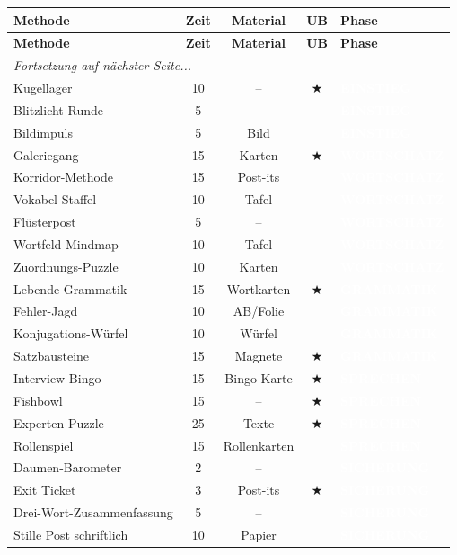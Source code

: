 \documentclass[11pt, a4paper]{article}
\newcommand{\tagEinstieg}{\colorbox{einstieg}{\textcolor{white}{\footnotesize\textbf{EINSTIEG}}}}
\newcommand{\tagWortschatz}{\colorbox{wortschatz}{\textcolor{white}{\footnotesize\textbf{WORTSCHATZ}}}}
\newcommand{\tagGrammatik}{\colorbox{grammatik}{\textcolor{white}{\footnotesize\textbf{GRAMMATIK}}}}
\newcommand{\tagSprechen}{\colorbox{sprechen}{\textcolor{white}{\footnotesize\textbf{SPRECHEN}}}}
\newcommand{\tagSicherung}{\colorbox{sicherung}{\textcolor{white}{\footnotesize\textbf{SICHERUNG}}}}
\begin{document}
\renewcommand{\arraystretch}{1.3}
\begin{longtable}{|p{3.5cm}|c|c|c|p{4cm}|}
\hline
\textbf{Methode} & \textbf{Zeit} & \textbf{Material} & \textbf{UB} & \textbf{Phase} \\
\hline
\endfirsthead
\hline
\textbf{Methode} & \textbf{Zeit} & \textbf{Material} & \textbf{UB} & \textbf{Phase} \\
\hline
\endhead

\multicolumn{5}{l}{\textit{Fortsetzung auf nächster Seite...}} \\
\endfoot

\hline
\endlastfoot

Kugellager & 10 & -- & $\bigstar$ & \tagEinstieg \\
\hline
Blitzlicht-Runde & 5 & -- & & \tagEinstieg \\
\hline
Bildimpuls & 5 & Bild & & \tagEinstieg \\
\hline

Galeriegang & 15 & Karten & $\bigstar$ & \tagWortschatz \\
\hline
Korridor-Methode & 15 & Post-its & & \tagWortschatz \\
\hline
Vokabel-Staffel & 10 & Tafel & & \tagWortschatz \\
\hline
Flüsterpost & 5 & -- & & \tagWortschatz \\
\hline
Wortfeld-Mindmap & 10 & Tafel & & \tagWortschatz \\
\hline
Zuordnungs-Puzzle & 10 & Karten & & \tagWortschatz \\
\hline

Lebende Grammatik & 15 & Wortkarten & $\bigstar$ & \tagGrammatik \\
\hline
Fehler-Jagd & 10 & AB/Folie & & \tagGrammatik \\
\hline
Konjugations-Würfel & 10 & Würfel & & \tagGrammatik \\
\hline
Satzbausteine & 15 & Magnete & $\bigstar$ & \tagGrammatik \\
\hline

Interview-Bingo & 15 & Bingo-Karte & $\bigstar$ & \tagSprechen \\
\hline
Fishbowl & 15 & -- & $\bigstar$ & \tagSprechen \\
\hline
Experten-Puzzle & 25 & Texte & $\bigstar$ & \tagSprechen \\
\hline
Rollenspiel & 15 & Rollenkarten & & \tagSprechen \\
\hline

Daumen-Barometer & 2 & -- & & \tagSicherung \\
\hline
Exit Ticket & 3 & Post-its & $\bigstar$ & \tagSicherung \\
\hline
Drei-Wort-Zusammenfassung & 5 & -- & & \tagSicherung \\
\hline
Stille Post schriftlich & 10 & Papier & & \tagSicherung \\
\hline

\end{longtable}
\end{document}
